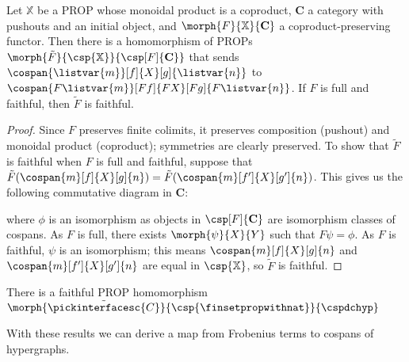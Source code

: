 \begin{theorem}
    \label{thm:cospan-homomorphism}
    Let \(\mathbb{X}\) be a PROP whose monoidal product is a coproduct,
    \(\mathbf{C}\) a category with pushouts and an initial object, and
    \(\morph{F}{\mathbb{X}}{\mathbf{C}}\) a coproduct-preserving functor.
    Then there is a homomorphism of PROPs \(
        \morph{\tilde{F}}{\csp{\mathbb{X}}}{\csp[F]{\mathbf{C}}}
    \) that sends \(\cospan{\listvar{m}}[f]{X}[g]{\listvar{{n}}}\) to
    \(\cospan{F\listvar{m}}[Ff]{FX}[Fg]{F\listvar{n}}\).
    If \(F\) is full and faithful, then \(\tilde{F}\) is faithful.
\end{theorem}
\begin{proof}
    Since \(F\) preserves finite colimits, it preserves composition (pushout)
    and monoidal product (coproduct); symmetries are clearly preserved.
    To show that \(\tilde{F}\) is faithful when \(F\) is full and faithful,
    suppose that \(
        \tilde{F}(\cospan{m}[f]{X}[g]{n})
        =
        \tilde{F}(\cospan{m}[f^\prime]{X}[g^\prime]{n})
    \).
    This gives us the following commutative diagram in \(\mathbf{C}\):
    \begin{center}
    \end{center}
    where \(\phi\) is an isomorphism as objects in \(\csp[F]{\mathbf{C}}\) are
    isomorphism classes of cospans.
    As \(F\) is full, there exists \(\morph{\psi}{X}{Y}\) such that
    \(F\psi = \phi\).
    As \(F\) is faithful, \(\psi\) is an isomorphism; this means
    \(\cospan{m}[f]{X}[g]{n}\) and \(\cospan{m}[f^\prime]{X}[g^\prime]{n}\) are
    equal in \(\csp{\mathbb{X}}\), so \(\tilde{F}\) is faithful.
\end{proof}

\begin{corollary}
    \label{cor:finset-to-hyp}
    There is a faithful PROP homomorphism
    \(\morph{\tilde{\pickinterfacesc{C}}}{\csp{\finsetpropwithnat}}{\cspdchyp}\)
\end{corollary}

With these results we can derive a map from Frobenius terms to cospans of
hypergraphs.

